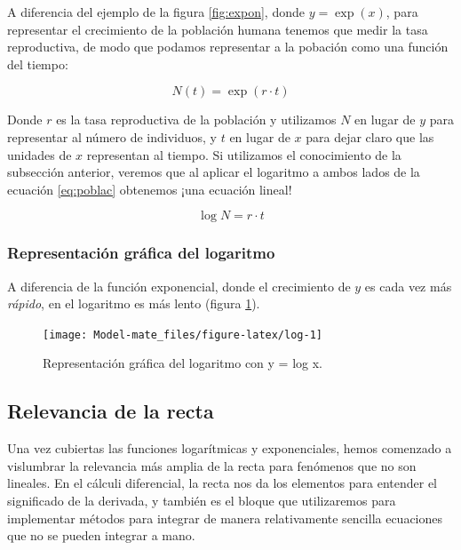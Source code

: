 \documentclass[
]{book}
\begin{document}
A diferencia del ejemplo de la figura \ref{fig:expon}, donde \(y = \exp(x)\), para representar el crecimiento de la población humana tenemos que medir la tasa reproductiva, de modo que podamos representar a la pobación como una función del tiempo:

\begin{equation}
N(t) = \exp(r \cdot t) \label{eq:poblac}
\end{equation}

Donde \(r\) es la tasa reproductiva de la población y utilizamos \(N\) en lugar de \(y\) para representar al número de individuos, y \(t\) en lugar de \(x\) para dejar claro que las unidades de \(x\) representan al tiempo. Si utilizamos el conocimiento de la subsección anterior, veremos que al aplicar el logaritmo a ambos lados de la ecuación \eqref{eq:poblac} obtenemos ¡una ecuación lineal!

\begin{equation}
    \log N = r \cdot t
\end{equation}

\hypertarget{representaciuxf3n-gruxe1fica-del-logaritmo}{%
\subsubsection{Representación gráfica del logaritmo}\label{representaciuxf3n-gruxe1fica-del-logaritmo}}

A diferencia de la función exponencial, donde el crecimiento de \(y\) es cada vez más \emph{rápido}, en el logaritmo es más lento (figura \ref{fig:log}).

\begin{figure}

{\centering \texttt{[image: Model-mate\_files/figure-latex/log-1]} 

}

\caption{Representación gráfica del logaritmo con y = log x.}\label{fig:log}
\end{figure}

\hypertarget{relevancia-de-la-recta}{%
\subsection{Relevancia de la recta}\label{relevancia-de-la-recta}}

Una vez cubiertas las funciones logarítmicas y exponenciales, hemos comenzado a vislumbrar la relevancia más amplia de la recta para fenómenos que no son lineales. En el cálculi diferencial, la recta nos da los elementos para entender el significado de la derivada, y también es el bloque que utilizaremos para implementar métodos para integrar de manera relativamente sencilla ecuaciones que no se pueden integrar a mano.
\end{document}
